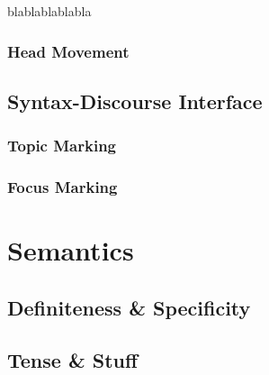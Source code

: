 blablablablabla

\subsection{Head Movement}

\section{Syntax-Discourse Interface}

\subsection{Topic Marking}

\subsection{Focus Marking}

\chapter{Semantics}

\section{Definiteness \& Specificity}\label{sec:spec-def}

\section{Tense \& Stuff}\label{sec:tense}